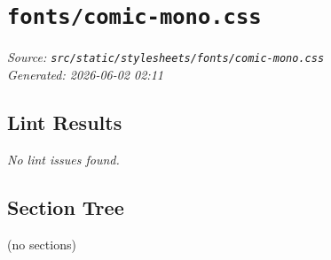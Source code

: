 
\section{\texttt{fonts/comic-mono.css}}
\textit{Source: \texttt{src/static/stylesheets/fonts/comic-mono.css}} \\
\textit{Generated: 2026-06-02 02:11} \\

\subsection{Lint Results}
\textit{No lint issues found.} \\

\subsection{Section Tree}
\begingroup
\linespread{0.9}\selectfont
\begin{verbnobox}[\FiraCode]
(no sections)
\end{verbnobox}
\endgroup
